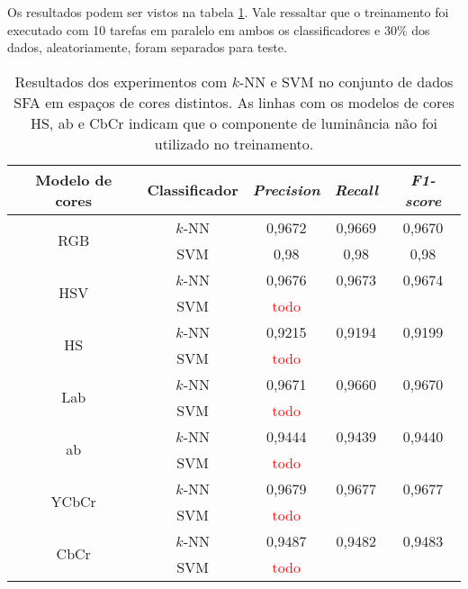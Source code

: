 Os resultados podem ser vistos na tabela \ref{tab:resultados_experimento_dois}. Vale ressaltar que o treinamento foi executado com 10 tarefas em paralelo em ambos os classificadores e 30\% dos dados, aleatoriamente, foram separados para teste.
\begin{table}[!htpb]
\centering
\begin{small}
\setlength{\tabcolsep}{8pt}

\begin{tabular}{|c|c|c|c|c|}\hline
 Modelo de cores & Classificador & \emph{Precision} & \emph{Recall} & \emph{F1-score} \\ \hline
 \multirow{2}{*}{RGB}   & $k$-NN  & 0,9672 & 0,9669 & 0,9670 \\ \cline{2-5}
                        & SVM     & 0,98 & 0,98 & 0,98 \\ \hline
 \multirow{2}{*}{HSV}   & $k$-NN  & 0,9676 & 0,9673 & 0,9674 \\ \cline{2-5}
                        & SVM     & \textcolor{red}{todo} && \\ \hline
 \multirow{2}{*}{HS}    & $k$-NN  & 0,9215 & 0,9194 & 0,9199 \\ \cline{2-5}
                        & SVM     & \textcolor{red}{todo} && \\ \hline
 \multirow{2}{*}{Lab}   & $k$-NN  & 0,9671 & 0,9660 & 0,9670 \\ \cline{2-5}
                        & SVM     & \textcolor{red}{todo} && \\ \hline
 \multirow{2}{*}{ab}    & $k$-NN  & 0,9444 & 0,9439 & 0,9440 \\ \cline{2-5}
                        & SVM     & \textcolor{red}{todo} && \\ \hline
 \multirow{2}{*}{YCbCr} & $k$-NN  & 0,9679 & 0,9677 & 0,9677 \\ \cline{2-5}
                        & SVM     & \textcolor{red}{todo} && \\ \hline
 \multirow{2}{*}{CbCr}  & $k$-NN  & 0,9487 & 0,9482 & 0,9483 \\ \cline{2-5}
                        & SVM     & \textcolor{red}{todo} && \\ \hline

\end{tabular}
\end{small}
\caption[Resultados dos experimentos com $k$-NN e SVM no conjunto de dados SFA em espaços de cores distintos]{Resultados dos experimentos com $k$-NN e SVM no conjunto de dados SFA em espaços de cores distintos. As linhas com os modelos de cores HS, ab e CbCr indicam que o componente de luminância não foi utilizado no treinamento.}
\label{tab:resultados_experimento_dois}
\end{table}

